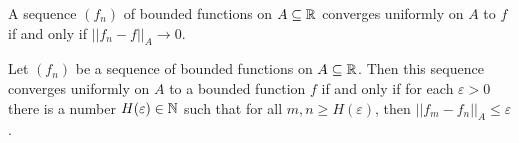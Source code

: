 \begin{lemma}
	A sequence $(f_n)$ of bounded functions on $A\subseteq \mathbb{R}$ converges uniformly on $A$ to $f$ if and only if $||f_n - f||_A \to 0$.
\end{lemma}

\begin{theorem}
	Let $(f_n)$ be a sequence of bounded functions on $A \subseteq \mathbb{R}$. Then this sequence converges uniformly on $A$ to a bounded function $f$ if and only if for each $\varepsilon>0$ there is a number $H(\varepsilon) \in \mathbb{N}$ such that for all $m,n\geq H(\varepsilon)$, then $||f_m-f_n||_A \leq \varepsilon$.
\end{theorem}
